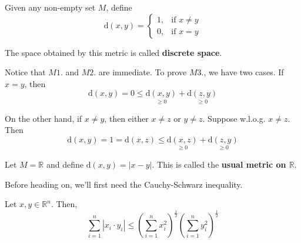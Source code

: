 \begin{example}
	Given any non-empty set $M$, define
	\begin{equation*}
	  \mathrm{d}(x,y)=\begin{cases}
	    1, & \text{if $x \neq y$}\\
	    0, & \text{if $x = y$}
	  \end{cases}
	\end{equation*}
	
	The space obtained by this metric is called \textbf{discrete space}.

	Notice that $M1.$ and $M2.$ are immediate. To prove $M3.$, we have two cases. If $x = y$, then
	\[
		\mathrm{d}(x,y) = 0 \leq \underset{\geq 0}{\mathrm{d}(x,y)} + \underset{\geq 0}{\mathrm{d}(z,y)}
	\]

	On the other hand, if $x \neq y$, then either $x \neq z$ or $y \neq z$. Suppose w.l.o.g. $x \neq z$. Then
	\[
		\mathrm{d}(x,y) = 1 = \mathrm{d}(x,z) \leq \underset{\geq 0}{\mathrm{d}(x,z)} + \underset{\geq 0}{\mathrm{d}(z,y)}
	\]
\end{example}

\begin{example}
	Let $M = \mathbb{R}$ and define $\mathrm{d}(x,y) = | x - y |$. This is called the \textbf{usual metric on $\mathbb{R}$}.
\end{example}

Before heading on, we'll first need the Cauchy-Schwarz inequality.

\begin{lemma}
Let $x, y \in \mathbb{R}^n$. Then,
\begin{equation}\label{eq:cs_in_1}
	\sum_{i=1}^n |x_i \cdot y_i| \leq \left( \sum_{i=1}^n x_i^2 \right)^{\frac{1}{2}} \left( \sum_{i=1}^n y_i^2 \right)^{\frac{1}{2}}
\end{equation}
\end{lemma}

